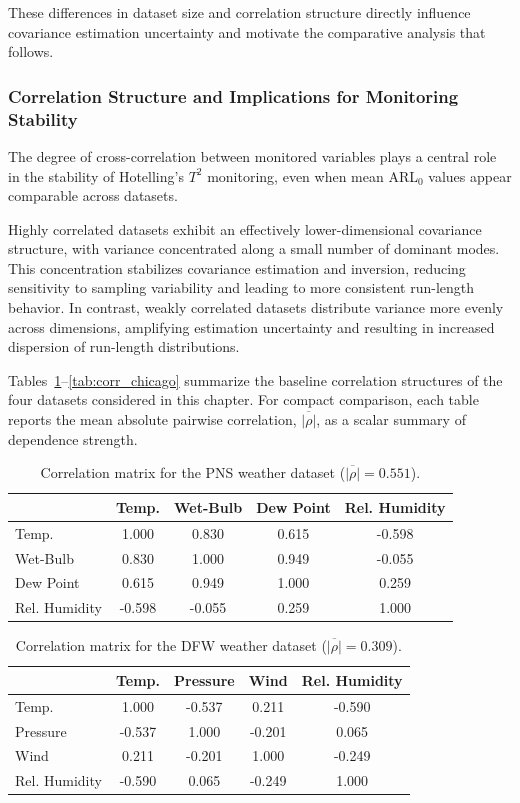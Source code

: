 These differences in dataset size and correlation structure directly influence covariance estimation uncertainty and motivate the comparative analysis that follows.

\subsubsection{Correlation Structure and Implications for Monitoring Stability}
\label{subsec:correlation_structure}

The degree of cross-correlation between monitored variables plays a central role in the stability of Hotelling’s $T^2$ monitoring, even when mean \ac{ARL}$_0$ values appear comparable across datasets.

Highly correlated datasets exhibit an effectively lower-dimensional covariance structure, with variance concentrated along a small number of dominant modes. This concentration stabilizes covariance estimation and inversion, reducing sensitivity to sampling variability and leading to more consistent run-length behavior. In contrast, weakly correlated datasets distribute variance more evenly across dimensions, amplifying estimation uncertainty and resulting in increased dispersion of run-length distributions.

Tables~\ref{tab:corr_pns}--\ref{tab:corr_chicago} summarize the baseline correlation structures of the four datasets considered in this chapter. For compact comparison, each table reports the mean absolute pairwise correlation, $\overline{|\rho|}$, as a scalar summary of dependence strength.

\begin{table}[H]
\centering
\caption{Correlation matrix for the PNS weather dataset ($\overline{|\rho|}=0.551$).}
\label{tab:corr_pns}
\begin{tabular}{lcccc}
\toprule
 & Temp. & Wet-Bulb & Dew Point & Rel. Humidity \\
\midrule
Temp.        & 1.000 & 0.830 & 0.615 & -0.598 \\
Wet-Bulb     & 0.830 & 1.000 & 0.949 & -0.055 \\
Dew Point    & 0.615 & 0.949 & 1.000 & 0.259 \\
Rel. Humidity& -0.598 & -0.055 & 0.259 & 1.000 \\
\bottomrule
\end{tabular}
\end{table}

\begin{table}[H]
\centering
\caption{Correlation matrix for the DFW weather dataset ($\overline{|\rho|}=0.309$).}
\label{tab:corr_dfw}
\begin{tabular}{lcccc}
\toprule
 & Temp. & Pressure & Wind & Rel. Humidity \\
\midrule
Temp.        & 1.000 & -0.537 & 0.211 & -0.590 \\
Pressure     & -0.537 & 1.000 & -0.201 & 0.065 \\
Wind         & 0.211 & -0.201 & 1.000 & -0.249 \\
Rel. Humidity& -0.590 & 0.065 & -0.249 & 1.000 \\
\bottomrule
\end{tabular}
\end{table}

